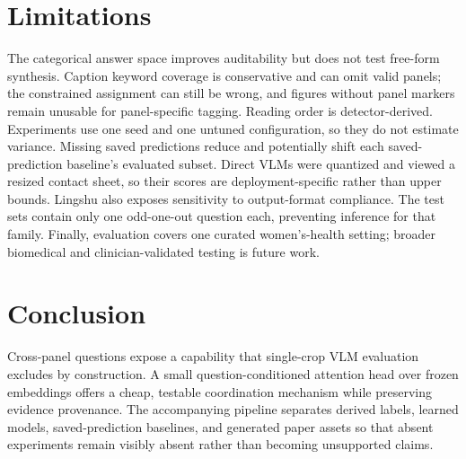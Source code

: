 \documentclass{article}
\begin{document}
\section{Limitations}
The categorical answer space improves auditability but does not test free-form synthesis. Caption keyword coverage is conservative and can omit valid panels; the constrained assignment can still be wrong, and figures without panel markers remain unusable for panel-specific tagging. Reading order is detector-derived. Experiments use one seed and one untuned configuration, so they do not estimate variance. Missing saved predictions reduce and potentially shift each saved-prediction baseline's evaluated subset. Direct VLMs were quantized and viewed a resized contact sheet, so their scores are deployment-specific rather than upper bounds. Lingshu also exposes sensitivity to output-format compliance. The test sets contain only one odd-one-out question each, preventing inference for that family. Finally, evaluation covers one curated women's-health setting; broader biomedical and clinician-validated testing is future work.

\section{Conclusion}
Cross-panel questions expose a capability that single-crop VLM evaluation excludes by construction. A small question-conditioned attention head over frozen embeddings offers a cheap, testable coordination mechanism while preserving evidence provenance. The accompanying pipeline separates derived labels, learned models, saved-prediction baselines, and generated paper assets so that absent experiments remain visibly absent rather than becoming unsupported claims.



\end{document}
